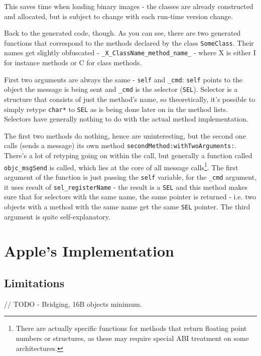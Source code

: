 \documentclass[a4paper, 11pt, fleqn]{book}
\begin{document}
This saves time when loading binary images - the classes are already constructed and allocated, but is subject to change with each run-time version change.

Back to the generated code, though. As you can see, there are two generated functions that correspond to the methods declared by the class \verb=SomeClass=. Their names get slightly obfuscated - \verb=_X_ClassName_method_name_= - where X is either I for instance methods or C for class methods.

First two arguments are always the same - \verb=self= and \verb=_cmd=: \verb=self= points to the object the message is being sent and \verb=_cmd= is the selector (\verb=SEL=). Selector is a structure that consists of just the method's name, so theoretically, it's possible to simply retype \verb=char*= to \verb=SEL= as is being done later on in the method lists. Selectors have generally nothing to do with the actual method implementation.

The first two methods do nothing, hence are uninteresting, but the second one calls (sends a message) its own method \verb=secondMethod:withTwoArguments:=. There's a lot of retyping going on within the call, but generally a function called \verb=objc_msgSend= is called, which lies at the core of all message calls\footnote{There are actually specific functions for methods that return floating point numbers or structures, as these may require special ABI treatment on some architectures.}. The first argument of the function is just passing the \verb=self= variable, for the \verb=_cmd= argument, it uses result of \verb=sel_registerName= - the result is a \verb=SEL= and this method makes sure that for selectors with the same name, the same pointer is returned - i.e. two objects with a method with the same name get the same \verb=SEL= pointer. The third argument is quite self-explanatory.


\chapter{Apple's Implementation}
\section{Limitations}
// TODO
- Bridging, 16B objects minimum.
\end{document}
